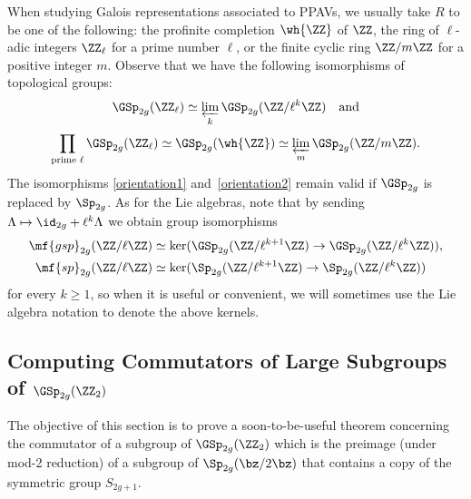 When studying Galois representations associated to PPAVs, we usually take $R$ to be one of the following: the profinite completion $\wh{\ZZ}$ of $\ZZ$, the ring of $\ell$-adic integers $\ZZ_{\ell}$ for a prime number $\ell$, or the finite cyclic ring $\ZZ / m \ZZ$ for a positive integer $m$. 
Observe that we have the following isomorphisms of topological groups:
\begin{equation}\label{orientation1}
\GSp_{2g}(\ZZ_\ell)   \simeq  \varprojlim_k \GSp_{2g}(\ZZ/ \ell^k \ZZ) \quad \text{and}
\end{equation}
\begin{equation}\label{orientation2}
\prod_{\text{prime } \ell} \GSp_{2g}(\ZZ_\ell) \simeq  \GSp_{2g}(\wh{\ZZ}) \simeq  \varprojlim_m \GSp_{2g}(\ZZ / m \ZZ).
\end{equation}
The isomorphisms \eqref{orientation1} and~\eqref{orientation2} %
remain valid if $\GSp_{2g}$ is replaced by $\Sp_{2g}$. As for the Lie algebras, note that by sending $\Lambda \mapsto \id_{2g} + \ell^k \Lambda$ we obtain group isomorphisms
\begin{align*}
\mf{gsp}_{2g}(\ZZ/ \ell \ZZ) &\simeq \ker(\GSp_{2g}(\ZZ/\ell^{k+1} \ZZ) \to \GSp_{2g}(\ZZ/ \ell^k \ZZ)), \\
\mf{sp}_{2g}(\ZZ/ \ell \ZZ) &\simeq \ker(\Sp_{2g}(\ZZ/\ell^{k+1} \ZZ) \to \Sp_{2g}(\ZZ/ \ell^k \ZZ))
\end{align*}
for every $k \geq 1$, so when it is useful or convenient, we will sometimes use the Lie algebra notation to denote the above kernels.


\subsection{Computing Commutators of Large Subgroups of $\GSp_{2g}(\ZZ_2)$} \label{mygawdjamesyousabeast}
The objective of this section is to prove a soon-to-be-useful theorem concerning the commutator of a subgroup of $\GSp_{2g}(\ZZ_2)$ which is the preimage (under mod-2 reduction) of a subgroup of $\Sp_{2g}(\bz / 2 \bz)$ that contains a copy of the symmetric group $S_{2g+1}$.

